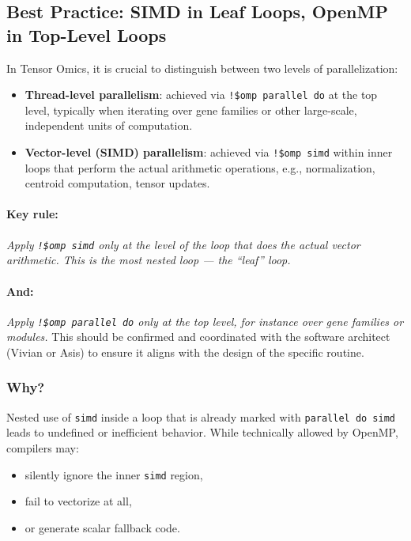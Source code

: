 \documentclass{article}
\begin{document}
\subsection{Best Practice: SIMD in Leaf Loops, OpenMP in Top-Level Loops}

In Tensor Omics, it is crucial to distinguish between two levels of parallelization:

\begin{itemize}
\item \textbf{Thread-level parallelism}: achieved via \texttt{!\$omp parallel do} at the top level, typically when iterating over gene families or other large-scale, independent units of computation.
\item \textbf{Vector-level (SIMD) parallelism}: achieved via \texttt{!\$omp simd} within inner loops that perform the actual arithmetic operations, e.g., normalization, centroid computation, tensor updates.
\end{itemize}

\paragraph{Key rule:} \emph{Apply \texttt{!\$omp simd} only at the level of the loop that does the actual vector arithmetic. This is the most nested loop — the ``leaf'' loop.}

\paragraph{And:} \emph{Apply \texttt{!\$omp parallel do} only at the top level, for instance over gene families or modules.} This should be confirmed and coordinated with the software architect (Vivian or Asis) to ensure it aligns with the design of the specific routine.

\subsubsection{Why?}

Nested use of \texttt{simd} inside a loop that is already marked with \texttt{parallel do simd} leads to undefined or inefficient behavior. While technically allowed by OpenMP, compilers may:

\begin{itemize}
\item silently ignore the inner \texttt{simd} region,
\item fail to vectorize at all,
\item or generate scalar fallback code.
\end{itemize}
\end{document}
